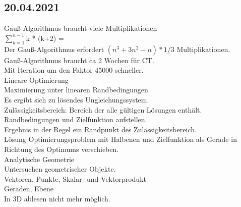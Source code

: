 \documentclass{article}
\begin{document}
	\subsection*{20.04.2021}
	Gauß-Algorithmus braucht viele Multiplikationen \\
	$\sum_{k=1}^{n-1}$k * (k+2) =  \\
	Der Gauß-Algorithmus erfordert $(n^3 + 3n^2 -n)*1/3$ Multiplikationen. \\
	Gauß-Algorithmus braucht ca 2 Wochen für CT. \\
	Mit Iteration um den Faktor 45000 schneller. \\
	Lineare Optimierung \\
	Maximierung unter linearen Randbedingungen \\
	Es ergibt sich zu lösendes Ungleichungssystem. \\
	Zulässigkeitsbereich: Bereich der alle gültigen Lösungen enthält. \\
	Randbedingungen und Zielfunktion aufstellen. \\
	Ergebnis in der Regel ein Randpunkt des Zulässigkeitsbereich. \\
	Lösung Optimierungsproblem mit Halbenen und Zielfunktion als Gerade in Richtung des Optimums verschieben. \\
	Analytische Geometrie \\
	Untersuchen geometrischer Objekte. \\
	Vektoren, Punkte, Skalar- und Vektorprodukt \\
	Geraden, Ebene \\
	In 3D ablesen nicht mehr möglich.
\end{document}
